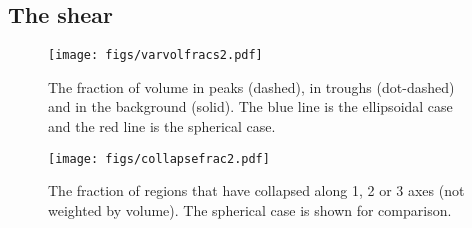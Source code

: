 \documentclass[11pt, a4paper]{article}
\begin{document}
\subsection{The shear}

\begin{figure}[t]
  \centering
  \texttt{[image: figs/varvolfracs2.pdf]} \\
  \caption{The fraction of volume in peaks (dashed), in troughs
    (dot-dashed) and in the background (solid). The blue line is the
    ellipsoidal case and the red line is the spherical case.}
  \label{fig:volfrac}
\end{figure}

\begin{figure}[t]
  \centering
  \texttt{[image: figs/collapsefrac2.pdf]} \\
  \caption{The fraction of regions that have collapsed along 1, 2 or 3
    axes (not weighted by volume). The spherical case is shown for comparison.}
  \label{fig:collfrac}
\end{figure}
\end{document}
